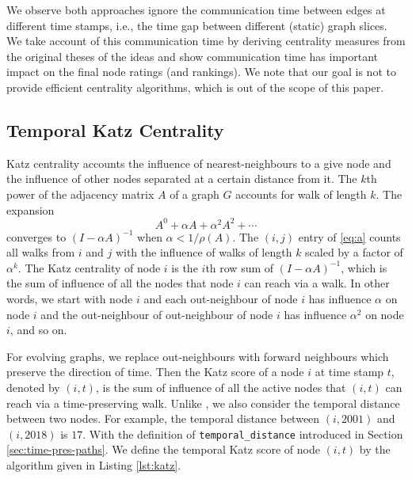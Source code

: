 \documentclass[12pt]{article}
\theoremstyle{definition}
\begin{document}
We observe both approaches ignore the communication time between edges at different time stamps, i.e., the time gap between different (static) graph slices. We take account of this communication time by deriving centrality measures from the original theses of the ideas and show communication time has important impact on the final node ratings (and rankings).
We note that our goal is not to provide efficient centrality algorithms, which is out of the scope of this paper.

\subsection{Temporal Katz Centrality}
\label{sec:temp-katz-centr}

Katz centrality accounts the influence of nearest-neighbours to a give node and the influence of other nodes
separated at a certain distance from it. The $k$th power of the adjacency matrix $A$ of a graph $G$ accounts for walk of length $k$. The expansion
\begin{equation}
  \label{eq:a}
  A^0 + \alpha A + \alpha^2 A^2 + \cdots
\end{equation}
converges to $(I - \alpha A)^{-1}$ when $\alpha < 1/\rho(A)$. The $(i,j)$ entry of \eqref{eq:a}
counts all walks from $i$ and $j$ with the influence of walks of length $k$ scaled by a factor of $\alpha^k$.
The Katz centrality of node $i$ is the $i$th row sum of $(I - \alpha A)^{-1}$, which is the sum of influence of all the nodes that node $i$ can reach via a walk.
In other words, we start with node $i$ and each out-neighbour of node $i$ has influence $\alpha$ on node $i$ and the out-neighbour of out-neighbour of node $i$ has influence $\alpha^2$ on node $i$, and so on.

For evolving graphs, we replace out-neighbours with forward neighbours which preserve the direction of time.
Then the Katz score of a node $i$ at time stamp $t$, denoted by $(i,t)$, is the sum of influence of all the active nodes that $(i,t)$ can reach via a time-preserving walk.
Unlike \cite{gphe11}, we also consider the temporal distance between two nodes. For example, the temporal distance between $(i, 2001)$ and $(i, 2018)$ is $17$.
With the definition of \texttt{temporal\_distance} introduced in Section \ref{sec:time-pres-paths}.
We define the temporal Katz score of node $(i, t)$ by the algorithm given in Listing \ref{lst:katz}.
\end{document}
